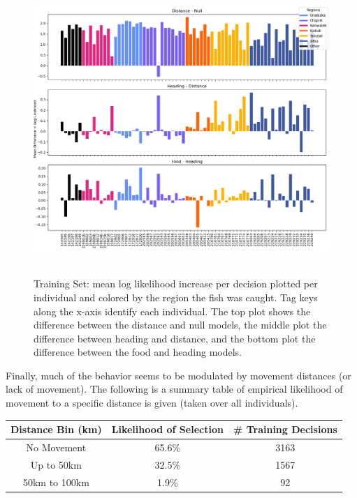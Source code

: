 \documentclass[11pt]{article}
\begin{document}
\begin{figure}[h!] 
	\centering
  \includegraphics[height=110mm]{figures/ll_change_train.png}
  \caption{Training Set: mean log likelihood increase per decision plotted per individual and colored  by the region the fish was caught. Tag keys along the x-axis identify each individual. The top plot shows the difference between the distance and null models, the middle plot the difference between heading and distance, and the bottom plot the difference between the food and heading models.}
  \label{fig:ll_train}
\end{figure}

\FloatBarrier


Finally, much of the behavior seems to be modulated by movement distances (or lack of movement). The following is a summary table of empirical likelihood of movement to a specific distance is given (taken over all individuals). 

\begin{center}
\begin{tabular}{| c | c | c |}
\hline
Distance Bin (km) & Likelihood of Selection & \# Training Decisions \\
\hline
No Movement & 65.6\% & 3163 \\
Up to 50km & 32.5\% & 1567 \\
50km to 100km & 1.9\% & 92 \\
\hline

\end{tabular}
\end{center}
\end{document}
